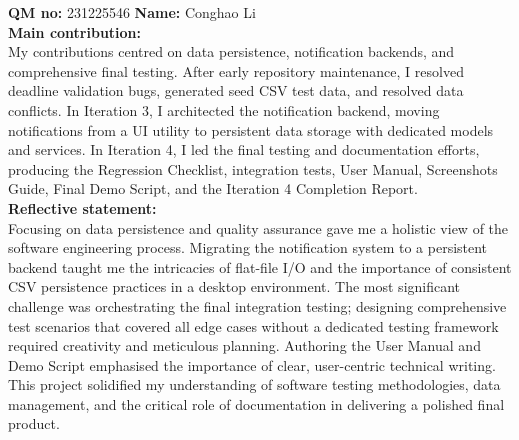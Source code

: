\documentclass[12pt, a4paper]{article}
\begin{document}
\vspace{1.5em}
\textbf{QM no:} 231225546 \hspace{2em} \textbf{Name:} Conghao Li\\
\textbf{Main contribution:}\\
My contributions centred on data persistence, notification backends, and comprehensive final testing. After early repository maintenance, I resolved deadline validation bugs, generated seed CSV test data, and resolved data conflicts. In Iteration 3, I architected the notification backend, moving notifications from a UI utility to persistent data storage with dedicated models and services. In Iteration 4, I led the final testing and documentation efforts, producing the Regression Checklist, integration tests, User Manual, Screenshots Guide, Final Demo Script, and the Iteration 4 Completion Report.\\
\textbf{Reflective statement:}\\
Focusing on data persistence and quality assurance gave me a holistic view of the software engineering process. Migrating the notification system to a persistent backend taught me the intricacies of flat-file I/O and the importance of consistent CSV persistence practices in a desktop environment. The most significant challenge was orchestrating the final integration testing; designing comprehensive test scenarios that covered all edge cases without a dedicated testing framework required creativity and meticulous planning. Authoring the User Manual and Demo Script emphasised the importance of clear, user-centric technical writing. This project solidified my understanding of software testing methodologies, data management, and the critical role of documentation in delivering a polished final product.
\end{document}
